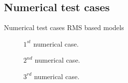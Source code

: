 \documentclass[10pt,aspectratio=169]{beamer} %
\begin{document}
\subsection{Numerical test cases}
\setcounter{subfigure}{0}
\begin{frame}{Numerical test cases RMS based models}
	\begin{minipage}[c]{0.32\textwidth}
		\begin{figure}[c]
			\centering
			\caption{\(1^{st}\) numerical case.}
		\end{figure}
	\end{minipage}
	\hfill
	\begin{minipage}[c]{0.32\textwidth}
		\begin{figure}[c]
			\centering
			\caption{\(2^{nd}\) numerical case.}
		\end{figure}
	\end{minipage}
	\hfill
	\begin{minipage}[c]{0.32\textwidth}
		\begin{figure}[c]
			\centering
			\caption{\(3^{rd}\) numerical case.}
		\end{figure}
	\end{minipage}
\end{frame}
\end{document}
